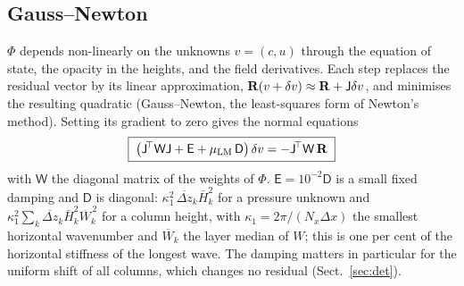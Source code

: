\subsection{Gauss--Newton}
$\Phi$ depends non-linearly on the unknowns $v=(c,u)$ through the equation of state, the opacity in the heights, and the field
derivatives. Each step replaces the residual vector by its linear approximation, $\mathbf R(v+\delta v)\approx\mathbf R+\mathsf J\delta v$, and
minimises the resulting quadratic (Gauss--Newton, the least-squares form of Newton's method). Setting its gradient to zero gives
the normal equations
\begin{equation}
\boxed{\;\big(\mathsf J^{\!\top}\mathsf W\mathsf J+\mathsf E+\mu_{\rm LM}\,\mathsf D\big)\,\delta v=-\mathsf J^{\!\top}\mathsf W\,\mathbf R\;}
\label{eq:normal}
\end{equation}
with $\mathsf W$ the diagonal matrix of the weights of $\Phi$. $\mathsf E=10^{-2}\mathsf D$ is a small fixed damping and
$\mathsf D$ is diagonal: $\kappa_1^2\,\overline{\Delta z}_k\bar H_k^2$ for a pressure unknown and
$\kappa_1^2\sum_k\overline{\Delta z}_k\bar H_k^2\overline W_k^{\,2}$ for a column height, with $\kappa_1=2\pi/(N_x\Delta x)$ the
smallest horizontal wavenumber and $\overline W_k$ the layer median of $W$; this is one per cent of the horizontal stiffness of
the longest wave. The damping matters in particular for the uniform shift of all columns, which changes no residual
(Sect.~\ref{sec:det}).

